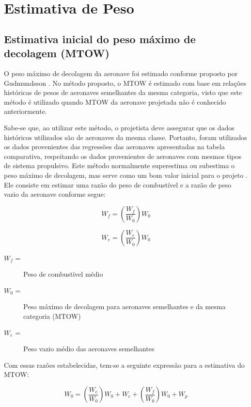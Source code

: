 \chapter{Estimativa de Peso}

\section{Estimativa inicial do peso máximo de decolagem (MTOW)}
\label{MTOW_inicial}
	O peso máximo de decolagem da aeronave foi estimado conforme proposto por Gudmundsson
  \cite{gudmundsson}.
  No método proposto, o MTOW é estimado com base em relações históricas de pesos de aeronaves semelhantes da mesma categoria, visto que este método é utilizado quando MTOW da aeronave projetada não é conhecido anteriormente.

	Sabe-se que, ao utilizar este método, o projetista deve assegurar que os dados históricos utilizados são de aeronaves da mesma classe.
  Portanto, foram utilizados os dados provenientes das regressões das aeronaves apresentadas na tabela comparativa, respeitando os dados provenientes de aeronaves com mesmos tipos de sistema propulsivo.
  Este método normalmente superestima ou subestima o peso máximo de decolagem, mas serve como um bom valor inicial para o projeto \cite{gudmundsson}.
	Ele consiste em estimar uma razão do peso de combustível e a razão de peso vazio da aeronave conforme segue:

  \begin{equation*}
    W_f = \left( \frac{W_f}{W_0} \right) W_0
  \end{equation*}

  \begin{equation*}
    W_e = \left( \frac{W_e}{W_0} \right) W_0
  \end{equation*}

  \begin{description}
    \item [$W_f$ =] Peso de combustível médio
    \item [$W_0$ =] Peso máximo de decolagem para aeronaves semelhantes e da mesma categoria (MTOW)
    \item [$W_e$ =] Peso vazio médio das aeronaves semelhantes
  \end{description}

  Com essas razões estabelecidas, tem-se a seguinte expressão para a estimativa do MTOW:

  \begin{equation*}
    W_0 =
    \left( \frac{W_e}{W_0} \right) W_0
    +
    W_c
    +
    \left( \frac{W_f}{W_0} \right) W_0
    +
    W_p
  \end{equation*}

